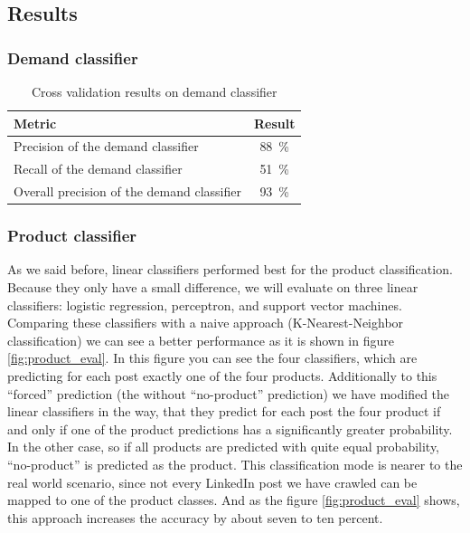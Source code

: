 \subsection{Results}
\label{sub:results}

\subsubsection{Demand classifier}
\label{ssub:demand_classifier}

\begin{table}[h]
	\centering
	\begin{tabular}{lc}
		\hline
		\textbf{Metric} & \textbf{Result}  \\
		\hline
		\hline
		Precision of the demand classifier & 88~\% \\
		\hline
		Recall of the demand classifier & 51~\%  \\
		\hline
		Overall precision of the demand classifier & 93~\%  \\
		\hline
	\end{tabular}
	\caption{Cross validation results on demand classifier}
	\label{table:demand_evaluation}
\end{table}



\subsubsection{Product classifier}
\label{ssub:product_classifier}

As we said before, linear classifiers performed best for the product classification.
Because they only have a small difference, we will evaluate on three linear classifiers: logistic regression, perceptron, and support vector machines.
Comparing these classifiers with a naive  approach (K-Nearest-Neighbor classification) we can see a better performance as it is shown in figure \ref{fig:product_eval}.
In this figure you can see the four classifiers, which are predicting for each post exactly one of the four products.
Additionally to this ``forced'' prediction (the without ``no-product'' prediction) we have modified the linear classifiers in the way, that they predict for each post the four product if and only if one of the product predictions has a significantly greater probability.
In the other case, so if all products are predicted with quite equal probability, ``no-product'' is predicted as the product.
This classification mode is nearer to the real world scenario, since not every LinkedIn post we have crawled can be mapped to one of the product classes.
And as the figure \ref{fig:product_eval} shows, this approach increases the accuracy by about seven to ten percent.

